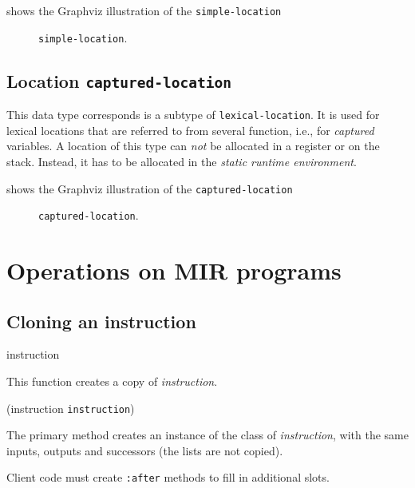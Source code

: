 shows the Graphviz illustration of the
\texttt{simple-location}

\begin{figure}
\begin{center}
\end{center}
\caption{\label{fig-simple-location}
\texttt{simple-location}.}
\end{figure}

\subsection{Location \texttt{captured-location}}

This data type corresponds is a subtype of \texttt{lexical-location}.
It is used for lexical locations that are referred to from several
function, i.e., for \emph{captured} variables.  A location of this
type can \emph{not} be allocated in a register or on the stack.
Instead, it has to be allocated in the \emph{static runtime
  environment}. 

 shows the Graphviz illustration of the
\texttt{captured-location}

\begin{figure}
\begin{center}
\end{center}
\caption{\label{fig-captured-location}
\texttt{captured-location}.}
\end{figure}

\section{Operations on MIR programs}

\subsection{Cloning an instruction}

 {instruction}

This function creates a copy of \textit{instruction}.

 {(instruction {\tt instruction})}

The primary method creates an instance of the class of
\textit{instruction}, with the same inputs, outputs and successors
(the lists are not copied). 

Client code must create \texttt{:after} methods to fill in additional
slots. 

